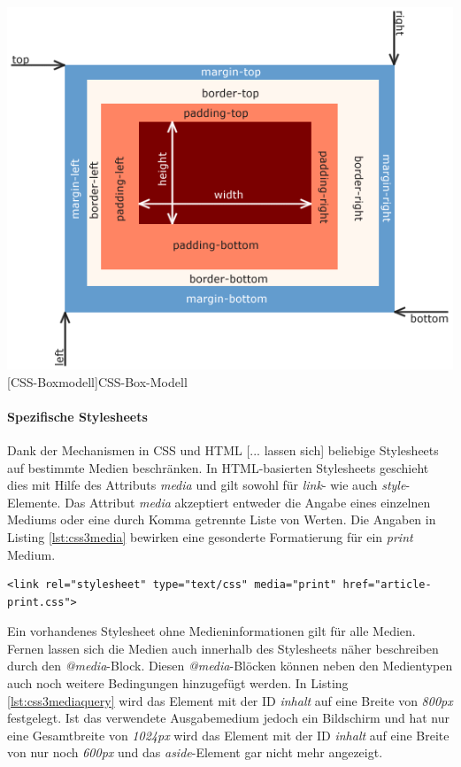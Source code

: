 \documentclass[12pt,a4paper,bibliography=totocnumbered,listof=totocnumbered]{scrartcl}
\begin{document}
	\vspace{1em}
	\begin{minipage}{\linewidth}
		\centering
		\includegraphics[width=0.8\linewidth]{images/css_boxmodell.png}
		[CSS-Boxmodell]{CSS-Box-Modell\cite{WikiCSS2014} }
		\label{fig:cssboxmodell}
	\end{minipage}
	
\paragraph{Spezifische Stylesheets} \glqq Dank der Mechanismen in CSS und HTML [... lassen sich] beliebige Stylesheets auf bestimmte Medien beschränken. In HTML-basierten Stylesheets geschieht dies mit Hilfe des Attributs \textit{media} und gilt sowohl für \textit{link}- wie auch \textit{style}-Elemente. Das Attribut \textit{media} akzeptiert entweder die Angabe eines einzelnen Mediums oder eine durch Komma getrennte Liste von Werten.\grqq{}\cite[S.434ff]{MeyeCasc2005} Die Angaben in Listing \ref{lst:css3media} bewirken eine gesonderte Formatierung für ein \textit{print} Medium.

	\vspace{1em}
	\begin{lstlisting}[caption=CSS3 medienspezifisches Stylesheet, label=lst:css3media]
<link rel="stylesheet" type="text/css" media="print" href="article-print.css">
	\end{lstlisting}
	
Ein vorhandenes Stylesheet ohne Medieninformationen gilt für alle Medien. Fernen lassen sich die Medien auch innerhalb des Stylesheets näher beschreiben durch den \textit{@media}-Block. Diesen \textit{@media}-Blöcken können neben den Medientypen auch noch weitere Bedingungen hinzugefügt werden. In Listing \ref{lst:css3mediaquery} wird das Element mit der ID \textit{inhalt} auf eine Breite von \textit{800px} festgelegt. Ist das verwendete Ausgabemedium jedoch ein Bildschirm und hat nur eine Gesamtbreite von \textit{1024px} wird das Element mit der ID \textit{inhalt} auf eine Breite von nur noch \textit{600px} und das \textit{aside}-Element gar nicht mehr angezeigt.
\end{document}
